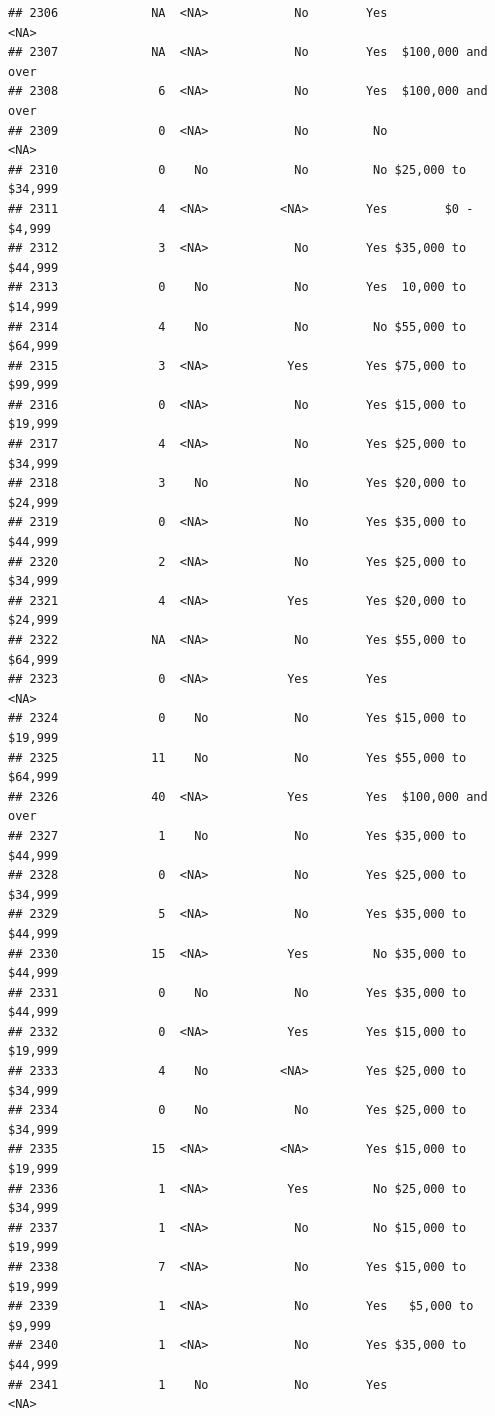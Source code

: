 \documentclass[man]{apa6}
\begin{document}
\begin{verbatim}
## 2306             NA  <NA>            No        Yes               <NA>
## 2307             NA  <NA>            No        Yes  $100,000 and over
## 2308              6  <NA>            No        Yes  $100,000 and over
## 2309              0  <NA>            No         No               <NA>
## 2310              0    No            No         No $25,000 to $34,999
## 2311              4  <NA>          <NA>        Yes        $0 - $4,999
## 2312              3  <NA>            No        Yes $35,000 to $44,999
## 2313              0    No            No        Yes  10,000 to $14,999
## 2314              4    No            No         No $55,000 to $64,999
## 2315              3  <NA>           Yes        Yes $75,000 to $99,999
## 2316              0  <NA>            No        Yes $15,000 to $19,999
## 2317              4  <NA>            No        Yes $25,000 to $34,999
## 2318              3    No            No        Yes $20,000 to $24,999
## 2319              0  <NA>            No        Yes $35,000 to $44,999
## 2320              2  <NA>            No        Yes $25,000 to $34,999
## 2321              4  <NA>           Yes        Yes $20,000 to $24,999
## 2322             NA  <NA>            No        Yes $55,000 to $64,999
## 2323              0  <NA>           Yes        Yes               <NA>
## 2324              0    No            No        Yes $15,000 to $19,999
## 2325             11    No            No        Yes $55,000 to $64,999
## 2326             40  <NA>           Yes        Yes  $100,000 and over
## 2327              1    No            No        Yes $35,000 to $44,999
## 2328              0  <NA>            No        Yes $25,000 to $34,999
## 2329              5  <NA>            No        Yes $35,000 to $44,999
## 2330             15  <NA>           Yes         No $35,000 to $44,999
## 2331              0    No            No        Yes $35,000 to $44,999
## 2332              0  <NA>           Yes        Yes $15,000 to $19,999
## 2333              4    No          <NA>        Yes $25,000 to $34,999
## 2334              0    No            No        Yes $25,000 to $34,999
## 2335             15  <NA>          <NA>        Yes $15,000 to $19,999
## 2336              1  <NA>           Yes         No $25,000 to $34,999
## 2337              1  <NA>            No         No $15,000 to $19,999
## 2338              7  <NA>            No        Yes $15,000 to $19,999
## 2339              1  <NA>            No        Yes   $5,000 to $9,999
## 2340              1  <NA>            No        Yes $35,000 to $44,999
## 2341              1    No            No        Yes               <NA>

\end{verbatim}
\end{document}

